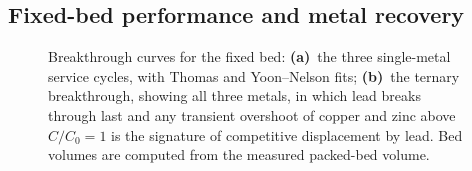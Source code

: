 
\subsection{Fixed-bed performance and metal recovery}
\label{sec:results-column}
%
%
%

\begin{figure}[htbp]
  \centering
  \caption[Fixed-bed breakthrough curves]{Breakthrough curves for the fixed bed: \textbf{(a)}~the three single-metal \PbII{} service cycles, with Thomas and Yoon--Nelson fits; \textbf{(b)}~the ternary breakthrough, showing all three metals, in which lead breaks through last and any transient overshoot of copper and zinc above $C/C_0 = 1$ is the signature of competitive displacement by lead. Bed volumes are computed from the measured packed-bed volume.}
  \label{fig:breakthrough}
\end{figure}

